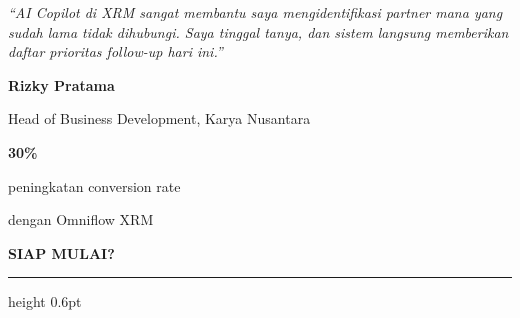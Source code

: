 \documentclass[a4paper]{article}
\newcommand{\sectiontitle}[1]{%
    \vspace{10pt}%
    {\fontsize{13}{16}\selectfont\bfseries\color{BlueDark} #1}\par\vspace{3pt}%
    {\color{BluePrimary}\hrule height 0.6pt}\par\vspace{8pt}%
}
\begin{document}
\noindent
\begin{minipage}[t]{0.485\textwidth}
    \colorbox{BlueBg}{%
        \begin{minipage}{\dimexpr\linewidth-2\fboxsep\relax}
            {\fontsize{9.5}{13}\selectfont\color{TextDark}\textit{``AI Copilot di XRM sangat membantu saya mengidentifikasi partner mana yang sudah lama tidak dihubungi. Saya tinggal tanya, dan sistem langsung memberikan daftar prioritas follow-up hari ini.''}}\par\vspace{4pt}
            {\fontsize{8.5}{11}\selectfont\bfseries\color{BluePrimary} Rizky Pratama}\par
            {\fontsize{8}{10}\selectfont\color{TextLight} Head of Business Development, Karya Nusantara}
        \end{minipage}}
\end{minipage}%
\hfill
\begin{minipage}[t]{0.485\textwidth}
    \colorbox{BlueBg}{%
        \begin{minipage}{\dimexpr\linewidth-2\fboxsep\relax}
            \begin{center}
                {\fontsize{20}{24}\selectfont\bfseries\color{RosePrimary} 30\%}\par
                {\fontsize{9.5}{12}\selectfont\color{TextDark} peningkatan conversion rate}\par
                {\fontsize{9.5}{12}\selectfont\color{TextDark} dengan Omniflow XRM}
            \end{center}
        \end{minipage}}
\end{minipage}

\sectiontitle{SIAP MULAI?}
\end{document}

